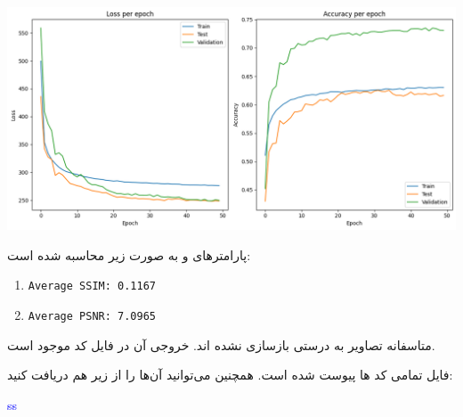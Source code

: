\begin{qsolve}
	\begin{center}
		\includegraphics*[width=1\linewidth]{pics/img16.png}
		\label{نمودار خطا و دقت}
	\end{center}
	
	پارامتر‌های  و  به صورت زیر محاسبه شده است:
	\begin{latin}
			\begin{enumerate}
			\item \texttt{Average SSIM: 0.1167}
			\item \texttt{Average PSNR: 7.0965}
		\end{enumerate} 
	\end{latin}
	
	متاسفانه تصاویر به درستی بازسازی نشده اند. خروجی آن در فایل کد موجود است.
\end{qsolve}



فایل تمامی کد ها پیوست شده است. همچنین می‌توانید آن‌ها را از  زیر هم دریافت کنید:

\begin{latin}
	\textcolor{blue}{ss}
\end{latin}



